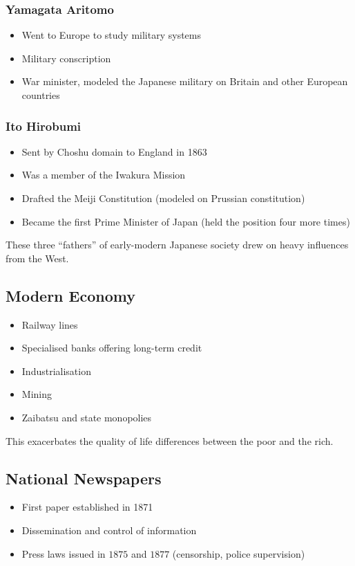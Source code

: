 \documentclass[class=article, crop=false]{standalone}
\begin{document}
  \subsubsection{Yamagata Aritomo}
  \begin{itemize}
    \item Went to Europe to study military systems
    \item Military conscription
    \item War minister, modeled the Japanese military on Britain and other European countries
  \end{itemize}
  \subsubsection{Ito Hirobumi}
  \begin{itemize}
    \item Sent by Choshu domain to England in 1863
    \item Was a member of the Iwakura Mission
    \item Drafted the Meiji Constitution (modeled on Prussian constitution)
    \item Became the first Prime Minister of Japan (held the position four more times)
  \end{itemize}
  \begin{note}{}
    These three ``fathers'' of early-modern Japanese society drew on heavy influences from the West.
  \end{note}
  \subsection{Modern Economy}
  \begin{itemize}
    \item Railway lines
    \item Specialised banks offering long-term credit
    \item Industrialisation
    \item Mining
    \item Zaibatsu and state monopolies
  \end{itemize}
  \begin{note}{}
    This exacerbates the quality of life differences between the poor and the rich.
  \end{note}
  \subsection{National Newspapers}
  \begin{itemize}
    \item First paper established in 1871
    \item Dissemination and control of information
    \item Press laws issued in $1875$ and $1877$ (censorship, police supervision)
  \end{itemize}
\end{document}
